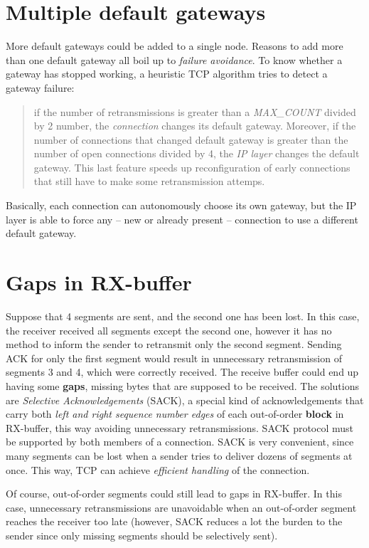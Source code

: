 \documentclass[a4paper, 11pt]{report}
\begin{document}
\section{Multiple default gateways}

More default gateways could be added to a single node. Reasons to add more than
one default gateway all boil up to \emph{failure avoidance}. To know whether a
gateway has stopped working, a heuristic TCP algorithm tries to detect a gateway failure:

\begin{quote}
	if the number of retransmissions is greater than a \emph{MAX\_COUNT}
	divided by 2 number, the \emph{connection} changes its default gateway.
	Moreover, if the number of connections that changed default gateway is
	greater than the number of open connections divided by 4, the \emph{IP
	layer} changes the default gateway. This last feature speeds up
	reconfiguration of early connections that still have to make some
	retransmission attemps.
\end{quote}

Basically, each connection can autonomously choose its own gateway, but the IP
layer is able to force any \--- new or already present \--- connection to use a
different default gateway.

\section{Gaps in RX-buffer}

Suppose that 4 segments are sent, and the second one has been lost. In this
case, the receiver received all segments except the second one, however it has
no method to inform the sender to retransmit only the second segment. Sending
ACK for only the first segment would result in unnecessary retransmission of
segments 3 and 4, which were correctly received. The receive buffer could end
up having some \textbf{gaps}, missing bytes that are supposed to be received.
The solutions are \emph{Selective Acknowledgements} (SACK), a special kind of
acknowledgements that carry both \emph{left and right sequence number edges} of
each out-of-order \textbf{block} in RX-buffer, this way avoiding unnecessary
retransmissions. SACK protocol must be supported by both members of a
connection. SACK is very convenient, since many segments can be lost when a
sender tries to deliver dozens of segments at once. This way, TCP can achieve
\emph{efficient handling} of the connection.

Of course, out-of-order segments could still lead to gaps in RX-buffer. In this
case, unnecessary retransmissions are unavoidable when an out-of-order segment
reaches the receiver too late (however, SACK reduces a lot the burden to the
sender since only missing segments should be selectively sent).
\end{document}
